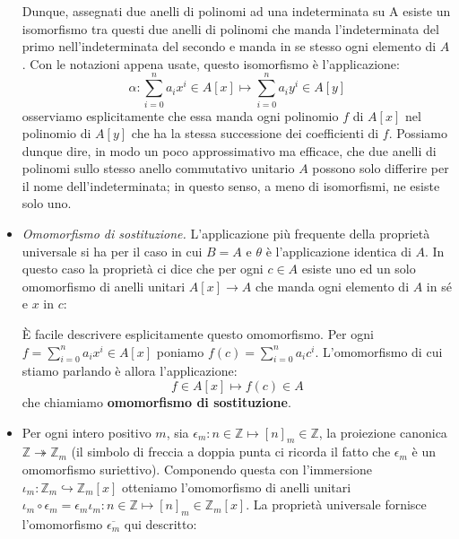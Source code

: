 \begin{itemize}
	Dunque, assegnati due anelli di polinomi ad una indeterminata su A esiste un isomorfismo tra questi due anelli di polinomi che manda l’indeterminata del primo nell’indeterminata del secondo e manda in se stesso ogni elemento di $A$. Con le notazioni appena usate, questo isomorfismo è l’applicazione:
	\begin{displaymath}
		\alpha: \sum_{i=0}^{n} a_{i}x^{i} \in A[x] \mapsto \sum_{i=0}^{n} a_{i}y^{i} \in A[y]
	\end{displaymath}
	osserviamo esplicitamente che essa manda ogni polinomio $f$ di $A[x]$ nel polinomio di $A[y]$ che ha la stessa successione dei coefficienti di $f$. Possiamo dunque dire, in modo un poco approssimativo ma efficace, che due anelli di polinomi sullo stesso anello commutativo unitario $A$ possono solo differire per il nome dell’indeterminata; in questo senso, a meno di isomorfismi, ne esiste solo uno.
	
	\item \textit{Omomorfismo di sostituzione.} L’applicazione più frequente della proprietà universale si ha per il caso in cui $B = A$ e $\theta$ è l’applicazione
	identica di $A$. In questo caso la proprietà ci dice che per ogni $c \in A$ esiste uno ed un solo omomorfismo di anelli unitari $A[x] \rightarrow A$ che manda ogni elemento di $A$ in sé e $x$ in $c$:
	\begin{center}
	\end{center}
	È facile descrivere esplicitamente questo omomorfismo. Per ogni $f  = \sum_{i=0}^{n} a_{i}x^{i} \in A[x]$ poniamo $f(c) = \sum_{i=0}^{n} a_{i}c^{i}$. L'omomorfismo di cui stiamo parlando è allora l'applicazione:
	\begin{displaymath}
		f \in A[x] \mapsto f(c) \in A
	\end{displaymath}
	che chiamiamo \textbf{omomorfismo di sostituzione}.
	
	\item Per ogni intero positivo $m$, sia $\epsilon_{m} : n \in \mathbb{Z} \mapsto [n]_{m} \in \mathbb{Z}$, la proiezione canonica $\mathbb{Z} \twoheadrightarrow \mathbb{Z}_{m}$ (il simbolo di freccia a doppia punta ci ricorda il fatto che $\epsilon_{m}$ è un omomorfismo suriettivo). Componendo questa con l'immersione $\iota_{m}: \mathbb{Z}_{m} \hookrightarrow \mathbb{Z}_{m}[x]$ otteniamo l'omomorfismo di anelli unitari $\iota_{m} \circ \epsilon_{m} = \epsilon_{m}\iota_{m} : n \in \mathbb{Z} \mapsto [n]_{m} \in \mathbb{Z}_{m}[x]$. La proprietà universale fornisce l'omomorfismo $\overline{\epsilon_{m}}$ qui descritto:
	

\end{itemize}

